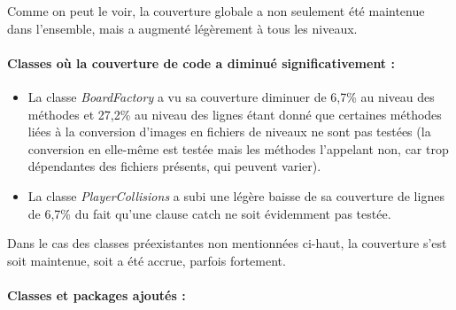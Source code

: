 \documentclass[12pt, openany]{report}
\begin{document}
\newpage
Comme on peut le voir, la couverture globale a non seulement été maintenue dans l'ensemble, mais a augmenté légèrement à tous les niveaux.

\paragraph{Classes où la couverture de code a diminué significativement : }

\begin{itemize}
	\item La classe \mbox{\textit{BoardFactory}} a vu sa couverture diminuer de 6,7\% au niveau des méthodes et 27,2\% au niveau des lignes étant donné que certaines méthodes liées à la conversion d'images en fichiers de niveaux ne sont pas testées (la conversion en elle-même est testée mais les méthodes l'appelant non, car trop dépendantes des fichiers présents, qui peuvent varier).
	\item La classe \mbox{\textit{PlayerCollisions}} a subi une légère baisse de sa couverture de lignes de 6,7\% du fait qu'une clause \og catch \fg \space ne soit évidemment pas testée.
\end{itemize}

Dans le cas des classes préexistantes non mentionnées ci-haut, la couverture s'est soit maintenue, soit a été accrue, parfois fortement.

\paragraph{Classes et packages ajoutés : }
\end{document}

